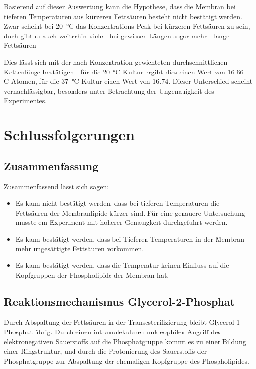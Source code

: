 \documentclass[a4paper,english]{scrreprt}
\begin{document}
Basierend auf dieser Auswertung kann die Hypothese, dass die Membran bei
tieferen Temperaturen aus kürzeren Fettsäuren besteht nicht bestätigt werden.
Zwar scheint bei \SI{20}{\celsius} das Konzentrations-Peak bei kürzeren
Fettsäuren zu sein, doch gibt es auch weiterhin viele - bei gewissen Längen
sogar mehr - lange Fettsäuren.

Dies lässt sich mit der nach Konzentration gewichteten durchschnittlichen
Kettenlänge bestätigen - für die \SI{20}{\celsius} Kultur ergibt dies einen
Wert von 16.66 C-Atomen, für die \SI{37}{\celsius} Kultur einen Wert von 16.74.
Dieser Unterschied scheint vernachlässigbar, besonders unter Betrachtung der
Ungenauigkeit des Experimentes.

\chapter{Schlussfolgerungen}

\section{Zusammenfassung}

Zusammenfassend lässt sich sagen:

\begin{itemize}
	\item Es kann nicht bestätigt werden, dass bei tieferen Temperaturen
		die Fettsäuren der Membranlipide kürzer sind. Für eine genauere
		Untersuchung müsste ein Experiment mit höherer Genauigkeit
		durchgeführt werden.
	\item Es kann bestätigt werden, dass bei Tieferen Temperaturen in der
		Membran mehr ungesättigte Fettsäuren vorkommen.
	\item Es kann bestätigt werden, dass die Temperatur keinen Einfluss
		auf die Kopfgruppen der Phospholipide der Membran hat.
\end{itemize}

\section{Reaktionsmechanismus Glycerol-2-Phosphat}

Durch Abspaltung der Fettsäuren in der Transesterifizierung bleibt
Glycerol-1-Phosphat übrig. Durch einen intramolekularen nukleophilen Angriff
des elektronegativen Sauerstoffs auf die Phosphatgruppe kommt es zu einer
Bildung einer Ringstruktur, und durch die Protonierung des Sauerstoffs der
Phosphatgruppe zur Abspaltung der ehemaligen Kopfgruppe des Phospholipides.
\end{document}
